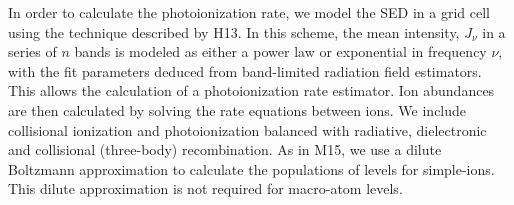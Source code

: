 \documentclass[useAMS,usenatbib]{mn2e_x}
\begin{document}
In order to calculate the photoionization rate, 
we model the SED in a grid cell using the technique described by H13. In this scheme,
the mean intensity, $J_{\nu}$ in a series of $n$ bands is modeled as either a power law or exponential
in frequency $\nu$, with the fit parameters deduced from band-limited radiation field estimators.
This allows the calculation of a photoionization rate estimator. Ion abundances are
then calculated by solving the rate equations between ions. We include collisional ionization and photoionization balanced with radiative, 
dielectronic and collisional (three-body) recombination.
As in M15, we use a dilute Boltzmann approximation to calculate 
the populations of levels for simple-ions. This dilute approximation 
is not required for macro-atom levels. 
\end{document}

